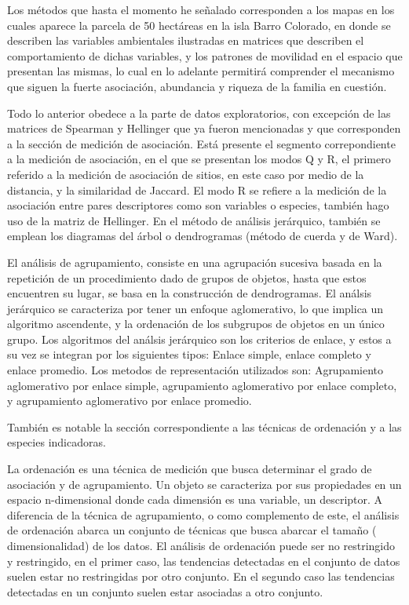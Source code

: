 \documentclass[11pt,]{article}
\begin{document}
Los métodos que hasta el momento he señalado corresponden a los mapas en
los cuales aparece la parcela de 50 hectáreas en la isla Barro Colorado,
en donde se describen las variables ambientales ilustradas en matrices
que describen el comportamiento de dichas variables, y los patrones de
movilidad en el espacio que presentan las mismas, lo cual en lo adelante
permitirá comprender el mecanismo que siguen la fuerte asociación,
abundancia y riqueza de la familia en cuestión.

Todo lo anterior obedece a la parte de datos exploratorios, con
excepción de las matrices de Spearman y Hellinger que ya fueron
mencionadas y que corresponden a la sección de medición de asociación.
Está presente el segmento correpondiente a la medición de asociación, en
el que se presentan los modos Q y R, el primero referido a la medición
de asociación de sitios, en este caso por medio de la distancia, y la
similaridad de Jaccard. El modo R se refiere a la medición de la
asociación entre pares descriptores como son variables o especies,
también hago uso de la matriz de Hellinger. En el método de análisis
jerárquico, también se emplean los diagramas del árbol o dendrogramas
(método de cuerda y de Ward).

El análisis de agrupamiento, consiste en una agrupación sucesiva basada
en la repetición de un procedimiento dado de grupos de objetos, hasta
que estos encuentren su lugar, se basa en la construcción de
dendrogramas. El análsis jerárquico se caracteriza por tener un enfoque
aglomerativo, lo que implica un algoritmo ascendente, y la ordenación de
los subgrupos de objetos en un único grupo. Los algoritmos del análsis
jerárquico son los criterios de enlace, y estos a su vez se integran por
los siguientes tipos: Enlace simple, enlace completo y enlace promedio.
Los metodos de representación utilizados son: Agrupamiento aglomerativo
por enlace simple, agrupamiento aglomerativo por enlace completo, y
agrupamiento aglomerativo por enlace promedio.

También es notable la sección correspondiente a las técnicas de
ordenación y a las especies indicadoras.

La ordenación es una técnica de medición que busca determinar el grado
de asociación y de agrupamiento. Un objeto se caracteriza por sus
propiedades en un espacio n-dimensional donde cada dimensión es una
variable, un descriptor. A diferencia de la técnica de agrupamiento, o
como complemento de este, el análisis de ordenación abarca un conjunto
de técnicas que busca abarcar el tamaño ( dimensionalidad) de los datos.
El análisis de ordenación puede ser no restringido y restringido, en el
primer caso, las tendencias detectadas en el conjunto de datos suelen
estar no restringidas por otro conjunto. En el segundo caso las
tendencias detectadas en un conjunto suelen estar asociadas a otro
conjunto.
\end{document}

